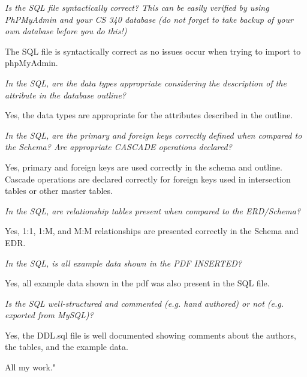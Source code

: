 \documentclass{article}
\begin{document}
\begin{tcolorbox}[colback=secondarycolor, colframe=primarycolor, title=\textbf{Step 2: Peer Review 2 - Daniel Guardado}]
\vspace{0.2cm}
\textit{Is the SQL file syntactically correct? This can be easily verified by using PhPMyAdmin and your CS 340 database (do not forget to take backup of your own database before you do this!)}

\vspace{0.05cm}
The SQL file is syntactically correct as no issues occur when trying to import to phpMyAdmin. 

\vspace{0.2cm}
\textit{In the SQL, are the data types appropriate considering the description of the attribute in the database outline?}

\vspace{0.05cm}
Yes, the data types are appropriate for the attributes described in the outline. 

\vspace{0.2cm}
\textit{In the SQL, are the primary and foreign keys correctly defined when compared to the Schema? Are appropriate CASCADE operations declared?}

\vspace{0.05cm}
Yes, primary and foreign keys are used correctly in the schema and outline. Cascade operations are declared correctly for foreign keys used in intersection tables or other master tables. 

\vspace{0.2cm}
\textit{In the SQL, are relationship tables present when compared to the ERD/Schema?}

\vspace{0.05cm}
Yes, 1:1, 1:M, and M:M relationships are presented correctly in the Schema and EDR. 

\vspace{0.2cm}
\textit{In the SQL, is all example data shown in the PDF INSERTED?}

\vspace{0.05cm}
Yes, all example data shown in the pdf was also present in the SQL file. 

\vspace{0.2cm}
\textit{Is the SQL well-structured and commented (e.g. hand authored) or not (e.g. exported from MySQL)?}

\vspace{0.05cm}
Yes, the DDL.sql file is well documented showing comments about the authors, the tables, and the example data. 
 
\vspace{0.2cm}
All my work."

\vspace{0.2cm}
\end{tcolorbox}
\end{document}
